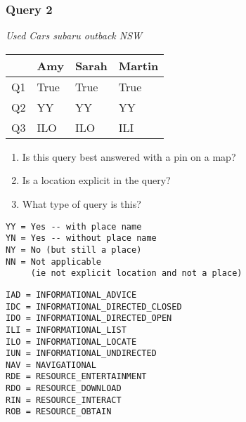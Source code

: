 \begin{frame}[fragile]
\frametitle{Query 2}
\vspace{1em}

\emph{Used Cars subaru outback NSW}

\vfill

\begin{table}
  \centering
  \begin{tabular}{ l l l l }
    & \textbf{Amy} & \textbf{Sarah} & \textbf{Martin}\\
    \toprule
    Q1 & True & True & True\\
Q2 & YY & YY & YY\\
Q3 & ILO & ILO & ILI\\
    \bottomrule
  \end{tabular}
\end{table}

\vfill

\tiny{

\begin{enumerate}
\item Is this query best answered with a pin on a map?
\item Is a location explicit in the query?
\item What type of query is this?
\end{enumerate}

\vfill

\begin{multicols}{2}
\begin{verbatim}
YY = Yes -- with place name
YN = Yes -- without place name
NY = No (but still a place)
NN = Not applicable 
     (ie not explicit location and not a place)
\end{verbatim}

\columnbreak
\begin{verbatim}
IAD = INFORMATIONAL_ADVICE
IDC = INFORMATIONAL_DIRECTED_CLOSED
IDO = INFORMATIONAL_DIRECTED_OPEN
ILI = INFORMATIONAL_LIST
ILO = INFORMATIONAL_LOCATE
IUN = INFORMATIONAL_UNDIRECTED
NAV = NAVIGATIONAL
RDE = RESOURCE_ENTERTAINMENT
RDO = RESOURCE_DOWNLOAD
RIN = RESOURCE_INTERACT
ROB = RESOURCE_OBTAIN
\end{verbatim}
\end{multicols}
}

\end{frame}


